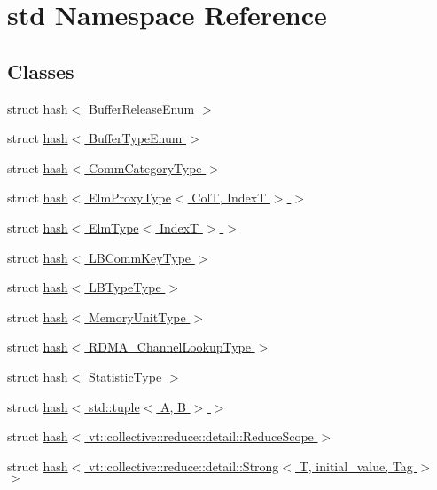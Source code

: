 \hypertarget{namespacestd}{}\section{std Namespace Reference}
\label{namespacestd}
\subsection*{Classes}
\begin{DoxyCompactItemize}
\item 
struct \hyperlink{structstd_1_1hash_3_01_buffer_release_enum_01_4}{hash$<$ Buffer\+Release\+Enum $>$}
\item 
struct \hyperlink{structstd_1_1hash_3_01_buffer_type_enum_01_4}{hash$<$ Buffer\+Type\+Enum $>$}
\item 
struct \hyperlink{structstd_1_1hash_3_01_comm_category_type_01_4}{hash$<$ Comm\+Category\+Type $>$}
\item 
struct \hyperlink{structstd_1_1hash_3_01_elm_proxy_type_3_01_col_t_00_01_index_t_01_4_01_4}{hash$<$ Elm\+Proxy\+Type$<$ Col\+T, Index\+T $>$ $>$}
\item 
struct \hyperlink{structstd_1_1hash_3_01_elm_type_3_01_index_t_01_4_01_4}{hash$<$ Elm\+Type$<$ Index\+T $>$ $>$}
\item 
struct \hyperlink{structstd_1_1hash_3_01_l_b_comm_key_type_01_4}{hash$<$ L\+B\+Comm\+Key\+Type $>$}
\item 
struct \hyperlink{structstd_1_1hash_3_01_l_b_type_type_01_4}{hash$<$ L\+B\+Type\+Type $>$}
\item 
struct \hyperlink{structstd_1_1hash_3_01_memory_unit_type_01_4}{hash$<$ Memory\+Unit\+Type $>$}
\item 
struct \hyperlink{structstd_1_1hash_3_01_r_d_m_a___channel_lookup_type_01_4}{hash$<$ R\+D\+M\+A\+\_\+\+Channel\+Lookup\+Type $>$}
\item 
struct \hyperlink{structstd_1_1hash_3_01_statistic_type_01_4}{hash$<$ Statistic\+Type $>$}
\item 
struct \hyperlink{structstd_1_1hash_3_01std_1_1tuple_3_01_a_00_01_b_01_4_01_4}{hash$<$ std\+::tuple$<$ A, B $>$ $>$}
\item 
struct \hyperlink{structstd_1_1hash_3_01vt_1_1collective_1_1reduce_1_1detail_1_1_reduce_scope_01_4}{hash$<$ vt\+::collective\+::reduce\+::detail\+::\+Reduce\+Scope $>$}
\item 
struct \hyperlink{structstd_1_1hash_3_01vt_1_1collective_1_1reduce_1_1detail_1_1_strong_3_01_t_00_01initial__value_00_01_tag_01_4_01_4}{hash$<$ vt\+::collective\+::reduce\+::detail\+::\+Strong$<$ T, initial\+\_\+value, Tag $>$ $>$}

\end{DoxyCompactItemize}
